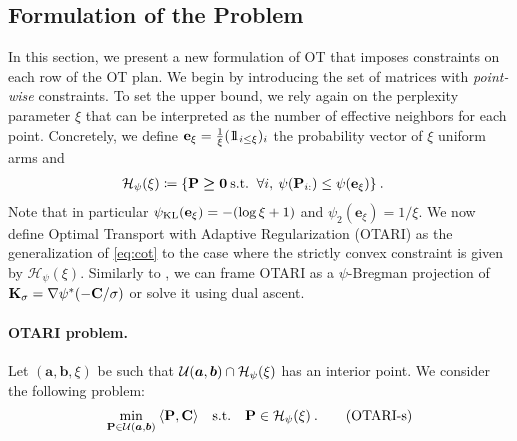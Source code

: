 \subsection{Formulation of the Problem}\label{sec:pwot}

In this section, we present a new formulation of OT that imposes constraints on each row of the OT plan.
We begin by introducing the set of matrices with \emph{point-wise} constraints. To set the upper bound, we rely again on the perplexity parameter $\xi$ that can be interpreted as the number of effective neighbors for each point. Concretely, we define $\mathbf{e}_{\xi} = \frac{1}{\xi}(1\!\!1_{i \leq \xi})_{i}$ the probability vector of $\xi$ uniform arms and
\begin{align}
  \mathcal{H}_\psi(\xi) &\coloneqq \{{\mathbf{P}} \bm{\geq} \bm{0} \: \text{s.t.}\ \: \forall i, \: \psi({\mathbf{P}}_{i:}) \leq \psi(\mathbf{e}_{\xi}) \} \:.
\end{align}
Note that in particular $\psi_{\operatorname{KL}}(\mathbf{e}_{\xi}) = - (\log \xi + 1)$ and $\psi_2(\mathbf{e}_{\xi}) = 1/\xi$.
We now define Optimal Transport with Adaptive Regularization (OTARI) as the generalization of \eqref{eq:cot} to the case where the strictly convex constraint is given by $\mathcal{H}_\psi(\xi)$. Similarly to , we can frame OTARI as a $\psi$-Bregman projection of ${\mathbf{K}}_\sigma = \nabla \psi^*(-{\mathbf{C}} / \sigma)$ or solve it using dual ascent.

\paragraph{OTARI problem.}
  Let $(\bm{a}, \bm{b}, \xi)$ be such that ${\mathcal{U}}(\bm{a}, \bm{b}) \cap \mathcal{H}_\psi(\xi)$ has an interior point.
  We consider the following problem:
  \begin{align}\label{eq:pcOT}
    \min_{{\mathbf{P}} \in {\mathcal{U}}(\bm{a}, \bm{b})} \: \langle {\mathbf{P}}, {\mathbf{C}} \rangle \quad \text{s.t.} \quad  {\mathbf{P}} \in \mathcal{H}_\psi(\xi) \:.
    \tag{OTARI-s}
\end{align}

